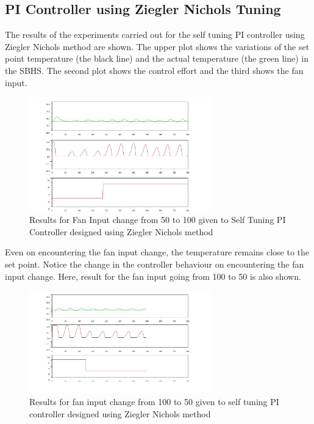 \subsection{PI Controller using Ziegler Nichols Tuning}
The results of the experiments carried out for the self tuning PI controller using Ziegler Nichols method are shown. The upper 
plot shows the variations of the set point temperature (the black line) and the actual temperature (the green line) in the 
SBHS. The second plot shows the control effort and the third shows the fan input.
\begin{figure}[h]
	\centering
\includegraphics[width=0.7\textwidth]{Vikas_self/report_tex/PID_results/self_tuning/FanDisturbance/PI/step50to100final.jpg}
	
\caption{Results for Fan Input change from 50 to 100 given to Self Tuning PI Controller designed using Ziegler Nichols method}
\end{figure}

Even on encountering the fan input change, the temperature remains close to the set point. Notice the change in the controller
behaviour on encountering the fan input change. 
\newpage
Here, result for the fan input going from 100 to 50 is also shown.
\begin{figure}[h]
	\centering
\includegraphics[width=0.7\textwidth]{Vikas_self/report_tex/PID_results/self_tuning/FanDisturbance/PI/step100to50.jpg}
	
\caption{Results for fan input change from 100 to 50 given to self tuning PI controller designed using Ziegler Nichols method}
\end{figure}

